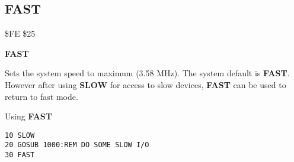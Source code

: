 
\newpage
\subsection{FAST}
\begin{description}[leftmargin=2cm,style=nextline]
\item [Token:] \$FE \$25
\item [Format:] {\bf FAST}
\item [Usage:] Sets the system speed
               to maximum (3.58 MHz).
               The system default is {\bf FAST}.
               However after using {\bf SLOW} for access to
               slow devices, {\bf FAST} can be used to return
               to fast mode.

\item [Example:] Using {\bf FAST}
\begin{tcolorbox}[colback=black,coltext=white]
\verbatimfont{\codefont}
\begin{verbatim}
10 SLOW
20 GOSUB 1000:REM DO SOME SLOW I/O
30 FAST
\end{verbatim}
\end{tcolorbox}
\end{description}


\newpage
